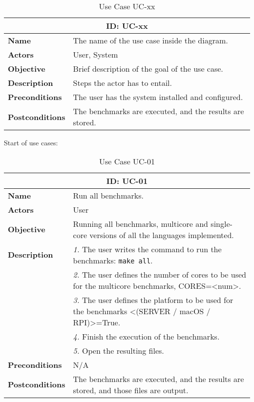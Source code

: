 \begin{table}[H]
    \centering
    \begin{tabular}{l p{10cm}}
        \toprule
        \multicolumn{2}{c}{\textbf{ID: UC-xx}} \\
        \toprule
        \textbf{Name}               &  The name of the use case inside the diagram. \\
        \textbf{Actors}             &  User, System \\
        \textbf{Objective}          &  Brief description of the goal of the use case. \\
        \textbf{Description}        &  Steps the actor has to entail. \\
        \textbf{Preconditions}      &  The user has the system installed and configured. \\
        \textbf{Postconditions}     &  The benchmarks are executed, and the results are stored. \\
    \end{tabular}
    \caption{Use Case UC-xx}
    \label{tab:uc-xx}
\end{table}

Start of use cases:
\begin{table}[H]
    \centering
    \begin{tabular}{l p{10cm}}
        \toprule
        \multicolumn{2}{c}{\textbf{ID: UC-01}} \\
        \toprule
        \textbf{Name}                         &  Run all benchmarks. \\
        \textbf{Actors}                       &  User \\
        \textbf{Objective}                    &  Running all benchmarks, multicore and single-core versions of all the languages implemented. \\
        \multirow{1}{*}{\textbf{Description}} & \textsl{1.} The user writes the command to run the benchmarks: \texttt{make all}.\\
                                              & \textsl{2.} The user defines the number of cores to be used for the multicore benchmarks, CORES=<num>.\\
                                              & \textsl{3.} The user defines the platform to be used for the benchmarks <(SERVER / macOS / RPI)>=True.\\
                                              & \textsl{4.} Finish the execution of the benchmarks.\\
                                              & \textsl{5.} Open the resulting files.\\ 
        \textbf{Preconditions}                &  N/A \\
        \textbf{Postconditions}               &  The benchmarks are executed, and the results are stored, and those files are output. \\
    \end{tabular}
    \caption{Use Case UC-01}
    \label{tab:uc-01}
\end{table}

